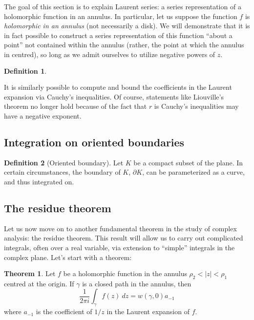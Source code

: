 \documentclass[aps,pra,showpacs,notitlepage,onecolumn,superscriptaddress,nofootinbib]{revtex4-1}
\theoremstyle{definition}
\newtheorem{definition}{Definition}[section]
\newtheorem{theorem}{Theorem}[section]
\begin{document}
\noindent The goal of this section is to explain Laurent series: a series representation of a holomorphic function in an annulus. In particular, let us suppose the
function $f$ is \emph{holomorphic in an annulus} (not necessarily a disk). We will demonstrate that it is in fact possible to construct a series representation
of this function ``about a point'' not contained within the annulus (rather, the point at which the annulus in centred), so long as we admit ourselves to utilize
negative powers of $z$.
\newline

\begin{definition}

\end{definition}

\noindent It is similarly possible to compute and bound the coefficients in the Laurent expansion via Cauchy's inequalities. Of course, statements like
Liouville's theorem no longer hold because of the fact that $r$ is Cauchy's inequalities may have a negative exponent.

\subsection{Integration on oriented boundaries}

\begin{definition}[Oriented boundary]
  Let $K$ be a compact subset of the plane. In certain circumstances, the boundary of $K$, $\partial K$, can be parameterized as a curve, and
  thus integrated on. 
  \end{definition}

\subsection{The residue theorem}

\noindent Let us now move on to another fundamental theorem in the study of complex analysis: the residue theorem. This result will allow us to carry out complicated
integrals, often over a real variable, via extension to ``simple'' integrals in the complex plane. Let's start with a theorem:

\begin{theorem}
  Let $f$ be a holomorphic function in the annulus $\rho_2 < |z| < \rho_1$ centred at the origin. If $\gamma$ is a closed path
  in the annulus, then
  \begin{equation}
    \frac{1}{2\pi i} \displaystyle\int_{\gamma} f(z) \ dz = w(\gamma, 0) a_{-1}
  \end{equation}
  where $a_{-1}$ is the coefficient of $1/z$ in the Laurent expansion of $f$.
\end{theorem}
\end{document}
